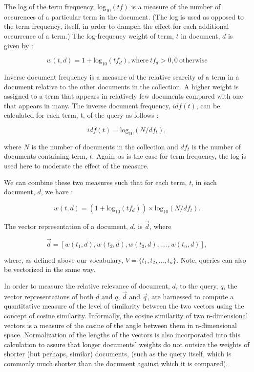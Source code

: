 The log of the term frequency, $\textrm{log}_{10}(tf)$ is a measure of the number of occurences of a particular term in the document.  (The log is used as opposed to the term frequency, itself, in order to dampen the effect for each additional occurrence of a term.)  The log-frequency weight of term, $t$ in document, $d$ is given by \cite{manning_2008_introduction_ch6}:

\begin{equation}
w(t,d) = 1 + \textrm{log}_{10}(tf_d), \textrm{where}\ tf_d > 0, 0\  \textrm{otherwise}
\end{equation}

Inverse document frequency is a measure of the relative scarcity of a term in a document relative to the other documents in the collection.  A higher weight is assigned to a term that appears in relatively few documents compared with one that appears in many.  The inverse document frequency, $idf(t)$, can be calculated for each term, t, of the query as follows \cite{manning_2008_introduction_ch6}:  

\begin{equation}
idf(t)  = \textrm{log}_{10}(N/df_t),
\end{equation}

\noindent
where $N$ is the number of documents in the collection and $df_t$ is the number of documents containing term, $t$.  Again, as is the case for term frequency, the log is used here to moderate the effect of the measure.

We can combine these two measures such that for each term, $t$, in each document, $d$, we have \cite{manning_2008_introduction_ch6}:

\begin{equation}
w(t,d) = (1 + \textrm{log}_{10}(tf_d)) \times \textrm{log}_{10}(N/df_t).
\end{equation}

\noindent
The vector representation of a document, $d$, is $\vec{d}$, where

\begin{equation}
\vec{d} =  [w(t_1,d), w(t_2,d), w(t_3,d),...., w(t_n, d)], 
\end{equation}

\noindent
where, as defined above our vocabulary, $V=\{t_1,t_2, ..., t_n\}$.  Note, queries can also be vectorized in the same way.  

In order to measure the relative relevance of document, $d$, to the query, $q$, the vector representations of both $d$ and $q$, $\vec{d}$ and $\vec{q}$, are harnessed to compute a quantitative measure of the level of similarity between the two vectors using the concept of cosine similarity.  Informally, the cosine similarity of two n-dimensional vectors is a measure of the cosine of the angle between them in n-dimensional space.  Normalization of the lengths of the vectors is also incorporated into this calculation to assure that longer documents' weights do not outsize the weights of shorter (but perhaps, similar) documents, (such as the query itself, which is commonly much shorter than the document against which it is compared).  

